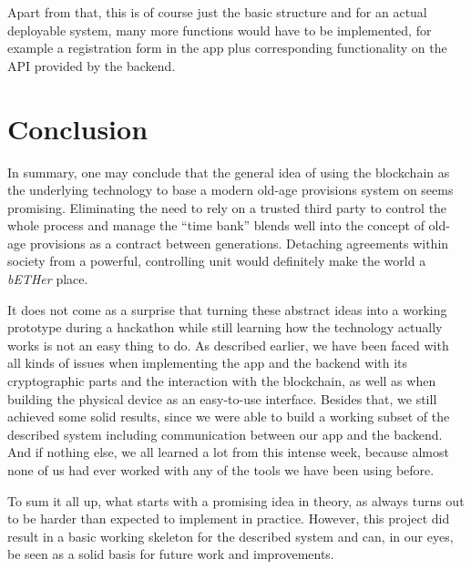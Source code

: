 \documentclass[12pt]{report}
\begin{document}
Apart from that, this is of course just the basic structure and for an actual deployable system, many more functions would have to be implemented, for example a registration form in the app plus corresponding functionality on the API provided by the backend.


\chapter{Conclusion}

In summary, one may conclude that the general idea of using the blockchain as the underlying technology to base a modern old-age provisions system on seems promising. Eliminating the need to rely on a trusted third party to control the whole process and manage the ``time bank'' blends well into the concept of old-age provisions as a contract between generations. Detaching agreements within society from a powerful, controlling unit would definitely make the world a \emph{bETHer} place.

It does not come as a surprise that turning these abstract ideas into a working prototype during a hackathon while still learning how the technology actually works is not an easy thing to do. As described earlier, we have been faced with all kinds of issues when implementing the app and the backend with its cryptographic parts and the interaction with the blockchain, as well as when building the physical device as an easy-to-use interface. Besides that, we still achieved some solid results, since we were able to build a working subset of the described system including communication between our app and the backend. And if nothing else, we all learned a lot from this intense week, because almost none of us had ever worked with any of the tools we have been using before.

To sum it all up, what starts with a promising idea in theory, as always turns out to be harder than expected to implement in practice. However, this project did result in a basic working skeleton for the described system and can, in our eyes, be seen as a solid basis for future work and improvements.





\end{document}
